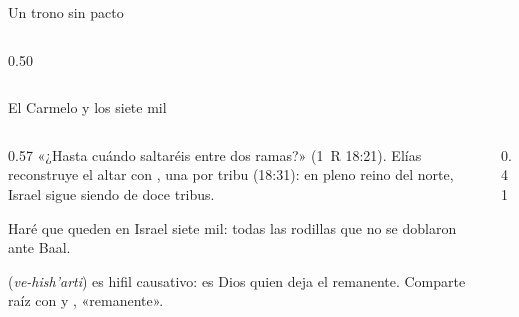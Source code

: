 \begin{frame}{Un trono sin pacto}
\begin{columns}[T,onlytextwidth]
\begin{column}{0.50\textwidth}
\elabpropia
\end{column}
\end{columns}
\end{frame}

\begin{frame}{El Carmelo y los siete mil}
\begin{columns}[c,onlytextwidth]
\begin{column}{0.57\textwidth}
\footnotesize «¿Hasta cuándo saltaréis entre dos ramas?» (1~R 18:21). Elías reconstruye el altar con , una por tribu (18:31): en pleno reino del norte, Israel sigue siendo de doce tribus.
\begin{cita}Haré que queden en Israel siete mil: todas las rodillas que no se doblaron ante Baal.\end{cita}
\begin{notalam}[Hebreo]
 (\emph{ve-hish'arti}) es hifil causativo: es Dios quien deja el remanente. Comparte raíz con  y , «remanente».
\end{notalam}
\end{column}
\begin{column}{0.41\textwidth}\end{column}
\end{columns}
\end{frame}

